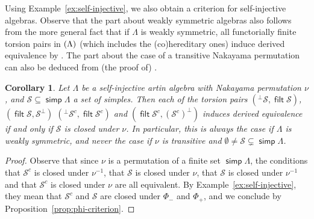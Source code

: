 \documentclass[a4paper,11pt]{amsart}
\theoremstyle{plain}
\newtheorem{cor}[thm]{Corollary}
\theoremstyle{definition}
\newcommand{\Scal}{\mathcal{S}} \newcommand{\Tcal}{\mathcal{T}} \newcommand{\Ucal}{\mathcal{U}}
\DeclareMathOperator{\simp}{\mathsf{simp}}
\DeclareMathOperator{\filt}{\mathsf{filt}}
\let\mod\relax
\DeclareMathOperator{\mod}{\mathsf{mod}}
\begin{document}
Using Example~\ref{ex:self-injective}, we also obtain a criterion for
self-injective algebras. Observe that the part about weakly symmetric algebras also
follows from the more general fact that if $\Lambda$ is weakly symmetric, all
functorially finite torsion pairs in $\mod(\Lambda)$ (which includes the
(co)hereditary ones) induce derived equivalence by
\cite[Prop.~3.6]{augu-duga-21}. The part about the case of a transitive Nakayama
permutation can also be deduced from (the proof of)
\cite[Cor.~5.8]{xi-zhang-25}.

\begin{cor}
	Let $\Lambda$ be a self-injective artin algebra with Nakayama permutation
	$\nu$, and $\Scal\subseteq\simp\Lambda$ a set of simples. Then each of
	the torsion pairs $({}^\bot\Scal,\filt\Scal)$, $(\filt\Scal,\Scal^\bot)$ 
	$({}^\bot\Scal^c,\filt\Scal^c)$ and
	$(\filt\Scal^c,(\Scal^c)^\bot)$ induces derived equivalence if and only if $\Scal$
	is closed under $\nu$. In particular, this is always the case if $\Lambda$ is
	weakly symmetric, and never the case if $\nu$ is transitive and $\emptyset\neq
	\Scal\subsetneq\simp\Lambda$.
\end{cor}

\begin{proof}
	Observe that since $\nu$ is a permutation of a finite set $\simp\Lambda$, the
	conditions
	that $\Scal^c$ is closed under $\nu^{-1}$, that $\Scal$
	is closed under $\nu$, that $\Scal$ is closed under $\nu^{-1}$ and that
	$\Scal^c$ is closed under $\nu$ are all equivalent. By
	Example~\ref{ex:self-injective}, they mean that $\Scal^c$ and $\Scal$ are
	closed under $\Phi_-$ and $\Phi_+$, and we conclude by
	Proposition~\ref{prop:phi-criterion}.
\end{proof}
\end{document}
